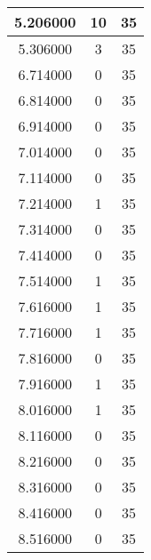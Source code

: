 \begin{longtable}[htbp]{|c|c|c|}
5.206000 & 10 & 35 \\ \hline
5.306000 & 3 & 35 \\ \hline
6.714000 & 0 & 35 \\ \hline
6.814000 & 0 & 35 \\ \hline
6.914000 & 0 & 35 \\ \hline
7.014000 & 0 & 35 \\ \hline
7.114000 & 0 & 35 \\ \hline
7.214000 & 1 & 35 \\ \hline
7.314000 & 0 & 35 \\ \hline
7.414000 & 0 & 35 \\ \hline
7.514000 & 1 & 35 \\ \hline
7.616000 & 1 & 35 \\ \hline
7.716000 & 1 & 35 \\ \hline
7.816000 & 0 & 35 \\ \hline
7.916000 & 1 & 35 \\ \hline
8.016000 & 1 & 35 \\ \hline
8.116000 & 0 & 35 \\ \hline
8.216000 & 0 & 35 \\ \hline
8.316000 & 0 & 35 \\ \hline
8.416000 & 0 & 35 \\ \hline
8.516000 & 0 & 35 \\ \hline
\end{longtable}
